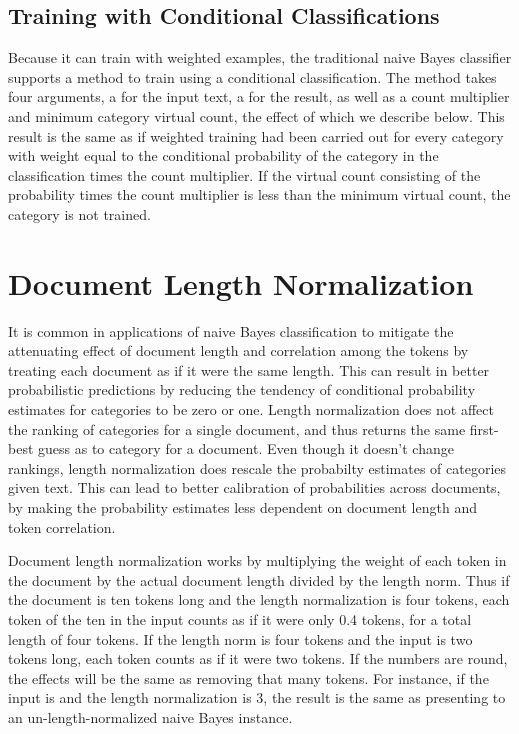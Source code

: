 \subsection{Training with Conditional Classifications}

Because it can train with weighted examples, the traditional naive
Bayes classifier supports a method to train using a conditional
classification.  The method  takes four
arguments, a  for the input text, a
 for the result, as well as a count
multiplier and minimum category virtual count, the effect of which we
describe below. This result is the same as if weighted training had
been carried out for every category with weight equal to the
conditional probability of the category in the classification times
the count multiplier.  If the virtual count consisting of the
probability times the count multiplier is less than the minimum
virtual count, the category is not trained.


\section{Document Length Normalization}\label{section:naive-bayes-length-norm}

It is common in applications of naive Bayes classification to mitigate
the attenuating effect of document length and correlation among the
tokens by treating each document as if it were the same length.  This
can result in better probabilistic predictions by reducing the
tendency of conditional probability estimates for categories to be
zero or one.  Length normalization does not affect the ranking of
categories for a single document, and thus returns the same first-best
guess as to category for a document.  Even though it doesn't change
rankings, length normalization does rescale the probabilty estimates
of categories given text.  This can lead to better calibration of
probabilities across documents, by making the probability estimates
less dependent on document length and token correlation.

Document length normalization works by multiplying the weight of each
token in the document by the actual document length divided by the
length norm.  Thus if the document is ten tokens long and the length
normalization is four tokens, each token of the ten in the input
counts as if it were only 0.4 tokens, for a total length of four
tokens.  If the length norm is four tokens and the input is two tokens
long, each token counts as if it were two tokens.  If the numbers are
round, the effects will be the same as removing that many tokens.  For
instance, if the input is  and
the length normalization is 3, the result is the same as presenting
 to an un-length-normalized naive Bayes
instance.

